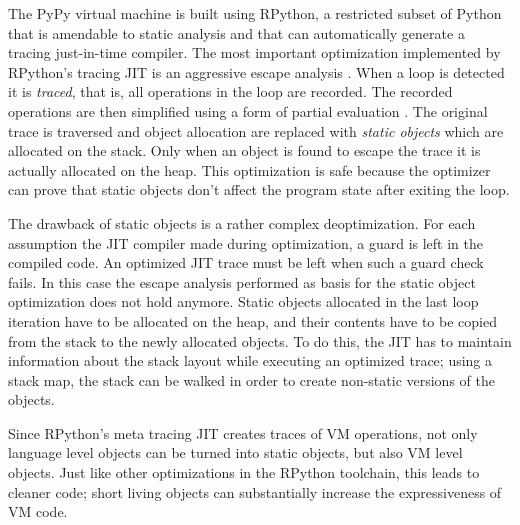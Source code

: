 \documentclass[english,10pt]{sigplanconf}
\begin{document}
The PyPy virtual machine is built using RPython, a restricted subset
of Python that is amendable to static analysis and that can automatically
generate a tracing just-in-time compiler. The most important optimization 
implemented by RPython's tracing JIT is
an aggressive escape analysis \cite{escapeAnalysis}. When a loop is detected
it is \emph{traced}, that is, all operations in the loop are recorded.
The recorded operations are then simplified using a form of partial
evaluation \cite{allocRemJIT}. The original
trace is traversed and object allocation are replaced with
\emph{static objects} which are allocated on the stack. Only when an
object is found to escape the trace it is actually allocated on the heap.
This optimization is safe because the optimizer can prove that static
objects don't affect the program state after exiting the loop.


The drawback of static objects is a rather complex deoptimization. For each
assumption the JIT compiler made during optimization, a guard is left in the
compiled code. An optimized JIT trace must be left when such a guard
check fails. In this
case the escape analysis performed as basis for the static object
optimization does not hold anymore.  Static objects allocated in the
last loop iteration have to be allocated on the heap, and their
contents have to be copied from the stack to the newly allocated
objects.  To do this, the JIT has to maintain information about the
stack layout while executing an optimized trace; using a stack map,
the stack can be walked in order to create non-static versions of the
objects.

Since RPython's meta tracing JIT creates traces of VM operations, not
only language level objects can be turned into static objects, but
also VM level objects.  Just like other optimizations in the RPython
toolchain, this leads to cleaner code; short living objects can
substantially increase the expressiveness of VM code.
\end{document}
